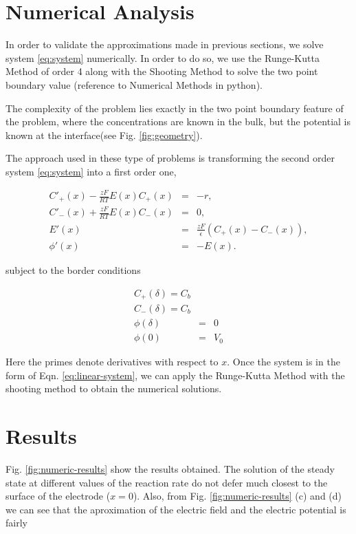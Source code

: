 


\section{Numerical Analysis}

In order to validate the approximations made in previous sections, we solve system \ref{eq:system} numerically. In order to do so, we use the Runge-Kutta Method of order 4 along with the  Shooting Method to solve the two point boundary value (reference to Numerical Methods in python).  



The complexity of the problem lies exactly in the two point boundary feature of the problem, where the concentrations are known in the bulk, but the potential is known at the interface(see Fig. \ref{fig:geometry}). 

The approach used in these type of problems is transforming the second order system \ref{eq:system} into a first order one,

\begin{eqnarray}
C'_+(x)-\frac{zF}{RT}E(x)C_+(x) &=& -r, \\
C'_-(x)+\frac{zF}{RT}E(x)C_-(x) &=& 0, \\
E'(x) &=& \frac{zF}{\epsilon}(C_+(x)-C_-(x)), \\
\phi'(x) &=& -E(x).
\label{eq:linear-system}
\end{eqnarray}

subject to the border conditions

\begin{eqnarray}
C_+(\delta) = C_b  \\
C_-(\delta) = C_b \\
\phi(\delta) &=& 0\\
\phi(0) &=&  V_0
\label{eq:linear-system}
\end{eqnarray}

Here the primes denote derivatives with respect to $x$. Once the system is in the form of Eqn. \ref{eq:linear-system}, we can apply the Runge-Kutta Method with the shooting method to obtain the numerical solutions. 


\section{Results}

Fig. \ref{fig:numeric-results} show the results obtained. The solution of the steady state at different values of the reaction rate do not defer much closest to the surface of the electrode ($x=0$). Also, from Fig. \ref{fig:numeric-results} (c) and (d) we can see that the aproximation of the electric field and the electric potential is fairly 

